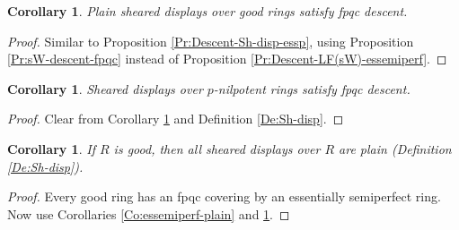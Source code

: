 \documentclass[a4paper,11pt]{amsart}
\theoremstyle{plain}
\newtheorem{Cor}[equation]{Corollary}
\theoremstyle{definition}
\theoremstyle{remark}
\newcommand{\bCo}{\begin{Cor}}
\newcommand{\eCo}{\end{Cor}}
\newcommand{\bproof}{\begin{proof}}
\newcommand{\eproof}{\end{proof}}
\numberwithin{equation}{section}
\begin{document}
\bCo
\label{Co:plain-sh-disp-good-fpqc}
Plain sheared displays over good rings satisfy fpqc descent.
\eCo

\bproof
Similar to Proposition \ref{Pr:Descent-Sh-disp-essp}, using Proposition \ref{Pr:sW-descent-fpqc} instead of Proposition \ref{Pr:Descent-LF(sW)-essemiperf}.
\eproof

\bCo
\label{Co:sheared-displays-fpqc-stack}
Sheared displays over $p$-nilpotent rings satisfy fpqc descent.
\eCo

\bproof
Clear from Corollary \ref{Co:plain-sh-disp-good-fpqc} and Definition \ref{De:Sh-disp}.
\eproof

\bCo
\label{Co:sheared-disp-over-good-rings-are-plain}
If $R$ is good, then all sheared displays over $R$ are plain (Definition \ref{De:Sh-disp}).
\eCo

\bproof
Every good ring has an fpqc covering by an essentially semiperfect ring. Now use Corollaries \ref{Co:essemiperf-plain} and \ref{Co:plain-sh-disp-good-fpqc}.
\eproof
\end{document}
